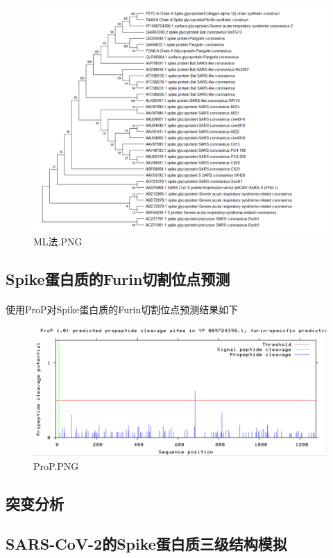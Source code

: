 \documentclass[supercite]{HustGraduPaper}
\begin{document}
	\begin{figure}[H]
		\centering
		\includegraphics[width=1\textwidth]{./material/practice4/ML.png}
		\caption{ML法.PNG}
	\end{figure}

	\subsection{Spike蛋白质的Furin切割位点预测}
	  \paragraph{}\label{subpara:subpara}使用ProP对Spike蛋白质的Furin切割位点预测结果如下
		\begin{figure}[H]
			\centering
			\includegraphics[width=1\textwidth]{./material/practice4/prop.png}
			\caption{ProP.PNG}
		\end{figure}
	\subsection{突变分析}
	\subsection{SARS-CoV-2的Spike蛋白质三级结构模拟}
\end{document}

